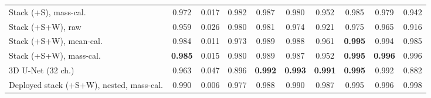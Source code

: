 \documentclass[fleqn,usenatbib]{rasti}
\begin{document}
\begin{table}
\begin{tabular}{lccccccccc}
Stack (+S), mass-cal.      & 0.972 & 0.017 & 0.982 & 0.987 & 0.980 & 0.952 & 0.985 & 0.979 & 0.942 \\
Stack (+S+W), raw          & 0.959 & 0.026 & 0.980 & 0.981 & 0.974 & 0.921 & 0.975 & 0.965 & 0.916 \\
Stack (+S+W), mean-cal.    & 0.984 & 0.011 & 0.973 & 0.989 & 0.988 & 0.961 & \textbf{0.995} & 0.994 & 0.985 \\
Stack (+S+W), mass-cal.    & \textbf{0.985} & 0.015 & 0.980 & 0.989 & 0.987 & 0.952 & \textbf{0.995} & \textbf{0.996} & 0.996 \\
3D U-Net (32 ch.)          & 0.963 & 0.047 & 0.896 & \textbf{0.992} & \textbf{0.993} & \textbf{0.991} & \textbf{0.995} & 0.992 & 0.882 \\
\hline
Deployed stack (+S+W), nested, mass-cal. & 0.990 & 0.006 & 0.977 & 0.988 & 0.990 & 0.987 & 0.995 & 0.996 & 0.998 \\
\hline
\end{tabular}
\end{table}
\end{document}

